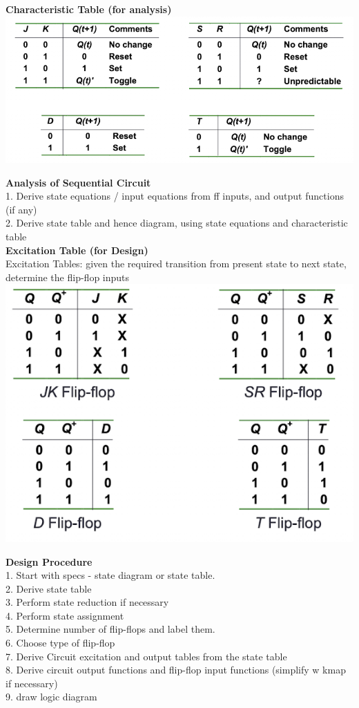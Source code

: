 \documentclass[10pt, a4paper]{article}
\begin{document}
\begin{multicols*}{3}
		\textbf{Characteristic Table (for analysis)}\\
		\includegraphics[scale=.6]{./assets/CharacteristicTable}
		
		\textbf{Analysis of Sequential Circuit}\\
		1. Derive state equations / input equations from ff inputs, and output functions (if 
		any)\\
		2. Derive state table and hence diagram, using state equations and characteristic table\\
		
		\textbf{Excitation Table (for Design)}\\
		Excitation Tables: given the required transition from present state to next state, determine the flip-flop inputs\\
		\includegraphics[scale=.6]{./assets/excitationTables}
		
		\textbf{Design Procedure}\\
		1. Start with specs - state diagram or state table.\\
		2. Derive state table\\
		3. Perform state reduction if necessary\\
		4. Perform state assignment\\
		5. Determine number of flip-flops and label them.\\
		6. Choose type of flip-flop\\
		7. Derive Circuit excitation and output tables from the state table\\
		8. Derive circuit output functions and flip-flop input functions (simplify w kmap if necessary)\\
		9. draw logic diagram\\
		

\end{multicols*}
\end{document}

